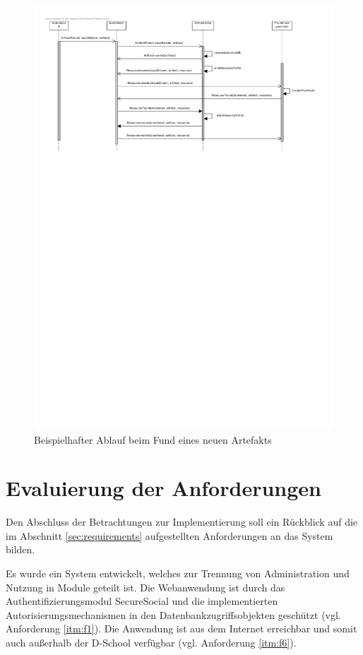 \begin{figure}[h]  
  \centering     
  \includegraphics[width=1.0\textwidth]{img/eventsystem_bsp.pdf}  
   \caption{Beispielhafter Ablauf beim Fund eines neuen Artefakts}   
  \label{fig:eventsystem-bsp} 
\end{figure}

\section{Evaluierung der Anforderungen}

Den Abschluss der Betrachtungen zur Implementierung soll ein Rückblick auf die im Abschnitt \ref{sec:requirements} aufgestellten Anforderungen an das System bilden.

Es wurde ein System entwickelt, welches zur Trennung von Administration und Nutzung in Module geteilt ist. Die Webanwendung ist durch das Authentifizierungsmodul SecureSocial und die implementierten Autorisierungsmechanismen in den Datenbankzugriffsobjekten geschützt (vgl. Anforderung \ref{itm:f1}). Die Anwendung ist aus dem Internet erreichbar und somit auch außerhalb der D-School verfügbar (vgl. Anforderung \ref{itm:f6}).

